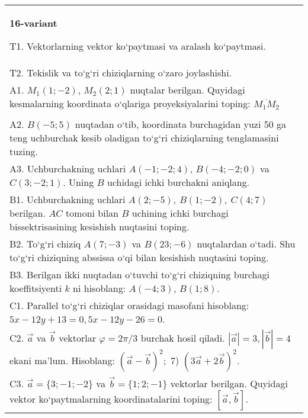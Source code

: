 \documentclass{article}
\begin{document}
\begin{tabular}{m{17cm}}
\textbf{16-variant}

T1. 
Vektorlarning vektor ko‘paytmasi va aralash ko‘paytmasi.
 \\
T2. 
Tekislik va to‘g‘ri chiziqlarning o‘zaro joylashishi.
 \\
A1. 
$M_1 (1; -2) $, $M_2 (2; 1) $ nuqtalar berilgan.
Quyidagi kesmalarning koordinata o‘qlariga proyeksiyalarini toping: $\overline{M_1M_2}$ \\
 \\
A2. 
$B (-5;5)$ nuqtadan o‘tib, koordinata burchagidan
yuzi 50 ga teng uchburchak kesib oladigan to‘g‘ri chiziqlarning tenglamasini
tuzing.
 \\
A3. 
Uchburchakning uchlari
$A (- 1; - 2;4) $, $B (- 4; - 2;0) $ va $C (3; -2;1) $. Uning $B$ uchidagi
ichki burchakni aniqlang.
 \\
B1. 
Uchburchakning uchlari \(A (2;-5),\ B (1;-2),\ C (4;7) \)
berilgan. $AC$ tomoni bilan $B$ uchining ichki burchagi
bissektrisasining kesishish nuqtasini toping.
 \\
B2. 
To‘g‘ri chiziq \(A (7;-3) \) va \(B (23;-6) \) nuqtalardan o‘tadi.
Shu to‘g‘ri chiziqning abssissa o‘qi bilan kesishish nuqtasini toping.
 \\
B3. 
Berilgan ikki nuqtadan o‘tuvchi to‘g‘ri chiziqning burchagi
koeffitsiyenti $k$ ni hisoblang: $A (-4;3) $, $B (1;8) $.
 \\
C1. 
Parallel to‘g‘ri chiziqlar orasidagi masofani hisoblang: $5x-12y+13=0, 5x-12y-26=0$.
 \\
C2. 
$\vec{a}$ va $\vec{b}$ vektorlar $\varphi = 2\pi/3$ burchak hosil qiladi. $|\vec{a}| = 3,|\vec{b}| = 4$ ekani ma’lum. Hisoblang:
$ (\vec{a} - \vec{b}) ^{2};$ 7) $ (3\vec{a} + 2\vec{b}) ^{2}$.
 \\
C3. 
$\vec{a} = \{ 3; - 1; - 2\}$ va $\vec{b} = \{ 1;2; - 1\}$ vektorlar berilgan. Quyidagi vektor ko‘paytmalarning koordinatalarini toping:
$\left\lbrack \vec{a},\vec{b} \right\rbrack$.
 \\

\end{tabular}
\vspace{1cm}
\end{document}
